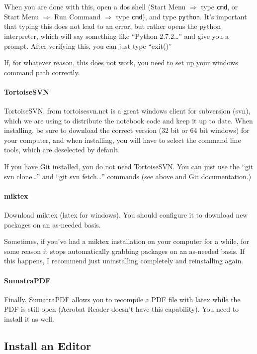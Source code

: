 When you are done with this, open a dos shell (Start Menu $\Rightarrow$ type \texttt{cmd}, or Start Menu $\Rightarrow$ Run Command $\Rightarrow$ type \texttt{cmd}),
    and type \texttt{python}.
It's important that typing this does not lead to an error,
    but rather opens the python interpreter,
    which will say something like ``Python 2.7.2\ldots'' and give you a prompt.
After verifying this, you can just type ``exit()''
\begin{inplacenotebox}
    If, for whatever reason, this does not work,
    you need to set up your windows command path correctly.
\end{inplacenotebox}
\paragraph{TortoiseSVN}
TortoiseSVN, from tortoisesvn.net is a great windows
    client for subversion (svn),
    which we are using to distribute the notebook code and keep
    it up to date.
When installing, be sure to download the correct version (32 bit or 64 bit windows) for your computer, and when installing, you will have to select the command line tools, which are deselected by default.
\begin{inplacenotebox}
If you have Git installed, you do not need TortoiseSVN.
You can just use the ``git svn clone\ldots'' and ``git svn fetch\ldots''
    commands (see above and Git documentation.)
\end{inplacenotebox}
\paragraph{miktex}
Download miktex (latex for windows).
You should configure it to download new packages on an as-needed basis.
\begin{inplacenotebox}
    Sometimes,
    if you've had a miktex installation on your computer for a while,
    for some reason it stops automatically grabbing packages on an as-needed
    basis.
    If this happens, I recommend just uninstalling completely and reinstalling
    again.
\end{inplacenotebox}
\paragraph{SumatraPDF}
Finally, SumatraPDF allows you to recompile a PDF
    file with latex while the PDF is still open
    (Acrobat Reader doesn't have this capability).
You need to install it as well.
\subsection{Install an Editor}
